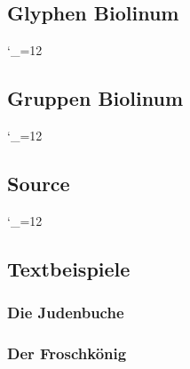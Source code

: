 \documentclass{fontdoku}
\begin{document}
\newpage
\subsection{Glyphen Biolinum}

{%
\setlength{\columnseprule}{.5pt}
\setlength{\columnsep}{1cm}
\begin{multicols}{3}
   \newcommand{\GYLPHNAME}[1]{\sindex[Bglyph]{#1}%
   \makebox[3cm][l]{\hypertarget{bglyph.#1}{}\hyperlink{bgglyph.#1}{#1}}\hfill%
   {\Huge\fbox{\Bglyph{#1}\strut}}\hfill\mbox{}\newline}
   \catcode`\_=12%
\end{multicols}
}


\newpage
\subsection{Gruppen Biolinum}
{\setlength{\columnseprule}{.5pt}
\setlength{\columnsep}{1cm}
\catcode`\_=12%
\newcommand{\GROUPHEAD}[1]{\begin{multicols}{3}[\subsubsection{#1}]}
\newcommand{\GROUPFOOT}{\end{multicols}}
\newcommand{\GROUPGLYPH}[2]{\sindex[Bglyph]{#2}%
   \makebox[3cm][l]{\hyperlink{bglyph.#2}{#2}\hypertarget{bgglyph.#2}{}{ \small(0x#1)}}%
   \hfill{\Huge\Bglyph{#2}\strut}\hfill\mbox{}\newline}
}



\newpage
\subsection{Source}



\newpage
{}
%
{\catcode`\_=12%
\def\indexcolumn{4}%
\printindex[Lglyph]
\printindex[Bglyph]
}
\printindex[idx]

\newpage
\subsection{Textbeispiele}

\subsubsection{Die Judenbuche}
{\color[HTML]{8c0b0b}

}
\newpage
\subsubsection{Der Froschkönig}
{\color[HTML]{8c0b0b}

}

%
\end{document}
